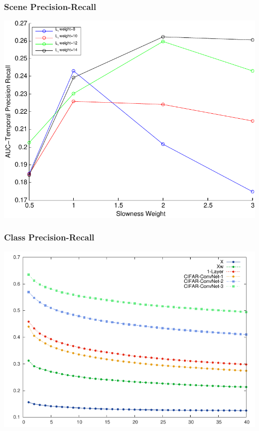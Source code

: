 \documentclass{beamer}
\begin{document}
\begin{frame}
\frametitle{Scene Precision-Recall} 
\centerline{\includegraphics[scale=0.6]{./images/TAE/AUC_slowness.pdf}} 
\end{frame}

\begin{frame}
\frametitle{Class Precision-Recall} 
\centerline{\includegraphics[scale=0.8]{./images/TAE/AUC_class.pdf}} 
\end{frame}
\end{document}
